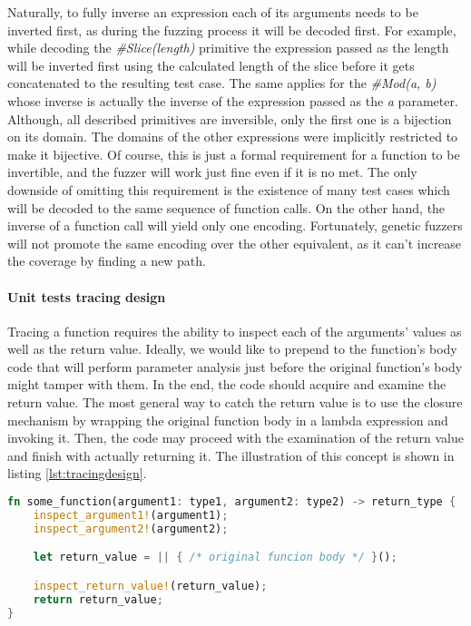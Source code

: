 Naturally, to fully inverse an expression each of its arguments needs to be inverted first, as during the fuzzing process it will be decoded first. For example, while decoding the \textit{\#Slice(length)} primitive the expression passed as the length will be inverted first using the calculated length of the slice before it gets concatenated to the resulting test case. The same applies for the \textit{\#Mod(a, b)} whose inverse is actually the inverse of the expression passed as the \textit{a} parameter. Although, all described primitives are inversible, only the first one is a bijection on its domain. The domains of the other expressions were implicitly restricted to make it bijective. Of course, this is just a formal requirement for a function to be invertible, and the fuzzer will work just fine even if it is no met. The only downside of omitting this requirement is the existence of many test cases which will be decoded to the same sequence of function calls. On the other hand, the inverse of a function call will yield only one encoding. Fortunately, genetic fuzzers will not promote the same encoding over the other equivalent, as it can't increase the coverage by finding a new path. 


\paragraph{Unit tests tracing design}
Tracing a function requires the ability to inspect each of the arguments' values as well as the return value. Ideally, we would like to prepend to the function's body code that will perform parameter analysis just before the original function's body might tamper with them. In the end, the code should acquire and examine the return value. The most general way to catch the return value is to use the closure mechanism by wrapping the original function body in a lambda expression and invoking it. Then, the code may proceed with the examination of the return value and finish with actually returning it. The illustration of this concept is shown in listing \ref{lst:tracingdesign}.

\begin{minipage}{\linewidth}
\begin{lstlisting}[language=rust,caption={Unit tests tracing design.},label={lst:tracingdesign}]
fn some_function(argument1: type1, argument2: type2) -> return_type {
    inspect_argument1!(argument1);
    inspect_argument2!(argument2);

    let return_value = || { /* original funcion body */ }();

    inspect_return_value!(return_value);
    return return_value;
}
\end{lstlisting}
\end{minipage}

